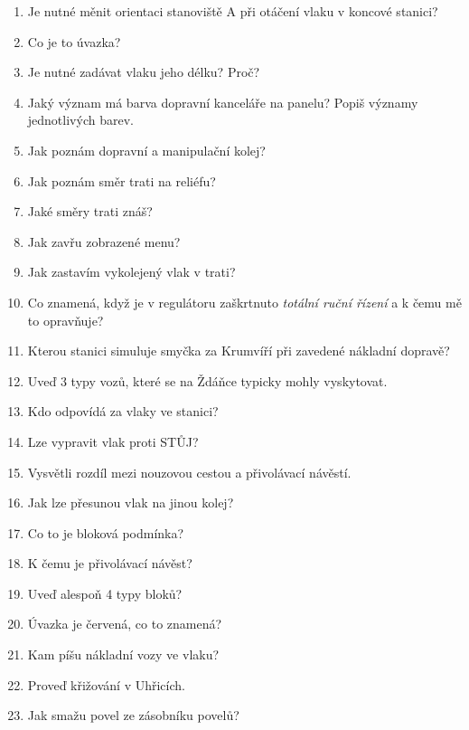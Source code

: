 \documentclass[12pt,a4paper]{article}
\begin{document}
\begin{enumerate}
	\item Je nutné měnit orientaci stanoviště A při otáčení vlaku v koncové stanici?
	
	\item Co je to úvazka?
	
	\item Je nutné zadávat vlaku jeho délku? Proč?
	
	\item Jaký význam má barva dopravní kanceláře na panelu? Popiš významy jednotlivých barev.
	
	\item Jak poznám dopravní a manipulační kolej?
	
	\item Jak poznám směr trati na reliéfu?
	
	\item Jaké směry trati znáš?
	
	\item Jak zavřu zobrazené menu?
	
	\item Jak zastavím vykolejený vlak v trati?
	
	\item Co znamená, když je v regulátoru zaškrtnuto \textit{totální ruční řízení} a k čemu mě to opravňuje?
	
	\item Kterou stanici simuluje smyčka za Krumvíří při zavedené nákladní dopravě?
	
	\item Uveď 3 typy vozů, které se na Ždáňce typicky mohly vyskytovat.
	
	\item Kdo odpovídá za vlaky ve stanici?
	
	\item Lze vypravit vlak proti STŮJ?
	
	\item Vysvětli rozdíl mezi nouzovou cestou a přivolávací návěstí.
	
	\item Jak lze přesunou vlak na jinou kolej?
	
	\item Co to je bloková podmínka?
	
	\item K čemu je přivolávací návěst?
	
	\item Uveď alespoň 4 typy bloků?
	
	\item Úvazka je červená, co to znamená?
	
	\item Kam píšu nákladní vozy ve vlaku?
	
	\item Proveď křižování v Uhřicích.
	
	\item Jak smažu povel ze zásobníku povelů?
	
	
	
\end{enumerate}
\end{document}
